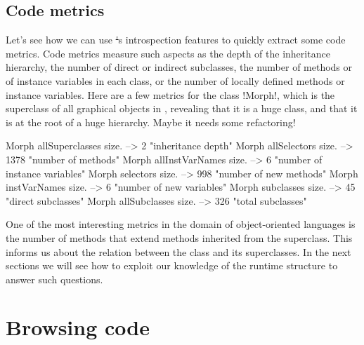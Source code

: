 \documentclass[a4paper,10pt,twoside]{book}
\begin{document}

\subsection{Code metrics}

Let's see how we can use \st's introspection features to quickly extract some code metrics.
Code metrics measure such aspects as the depth of the inheritance hierarchy, the number of direct or indirect subclasses, the number of methods or of instance variables in each class, or the number of locally defined methods or instance variables.
Here are a few metrics for the class \ct!Morph!, which is the superclass of all graphical objects in \pharo, revealing that it is a huge class, and that it is at the root of a huge hierarchy. Maybe it needs some refactoring! 

\begin{code}{}
Morph allSuperclasses size.  -->       2 "inheritance depth"
Morph allSelectors size.        --> 1378 "number of methods"
Morph allInstVarNames size. -->      6 "number of instance variables"
Morph selectors size.             -->  998 "number of new methods"
Morph instVarNames size.     -->      6 "number of new variables"
Morph subclasses size.          -->    45 "direct subclasses"
Morph allSubclasses size.      -->  326 "total subclasses"
\end{code}

One of the most interesting metrics in the domain of object-oriented languages is the number of methods that extend methods inherited from the superclass.
This informs us about the relation between the class and its superclasses.
In the next sections we will see how to exploit our knowledge of the runtime structure to answer such questions.


\section{Browsing code}
\end{document}
